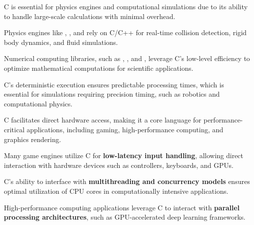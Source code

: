 \begin{NxSSSSBox}
	\begin{NxIDBox}
		C is essential for physics engines and computational simulations due to its ability to handle large-scale calculations with minimal overhead.
	\end{NxIDBox}
	\begin{NxIDBox}
		Physics engines like , , and  rely on C/C++ for real-time collision detection, rigid body dynamics, and fluid simulations.
	\end{NxIDBox}
	\begin{NxIDBox}
	Numerical computing libraries, such as , , and , leverage C’s low-level efficiency to optimize mathematical computations for scientific applications.
	\end{NxIDBox}
	\begin{NxIDBox}
		C’s deterministic execution ensures predictable processing times, which is essential for simulations requiring precision timing, such as robotics and computational physics.
	\end{NxIDBox}
\end{NxSSSSBox}

\begin{NxSSSSBox}
	\begin{NxIDBox}
		C facilitates direct hardware access, making it a core language for performance-critical applications, including gaming, high-performance computing, and graphics rendering.
	\end{NxIDBox}
	\begin{NxIDBox}
		Many game engines utilize C for \textbf{low-latency input handling}, allowing direct interaction with hardware devices such as controllers, keyboards, and GPUs.
	\end{NxIDBox}
	\begin{NxIDBox}
		C’s ability to interface with \textbf{multithreading and concurrency models} ensures optimal utilization of CPU cores in computationally intensive applications.
	\end{NxIDBox}
	\begin{NxIDBox}
		High-performance computing applications leverage C to interact with \textbf{parallel processing architectures}, such as GPU-accelerated deep learning frameworks.
	\end{NxIDBox}
\end{NxSSSSBox}

